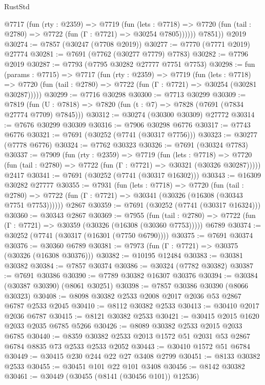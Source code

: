 \begin{lexlean}{RustStd}
\begin{coremodule}
          @7717
            (fun (rty : @2359) =>
            @7719
              (fun (lets : @7718) =>
              @7720 (fun (tail : @2780) => @7722 (fun (Γ : @7721) => @30254 @7805))))))
        @7851))
    @2019
@30274 := @7857 (@30247 (@7708 @2019))
@30277 := @7770 (@7771 @2019) @27774
@30281 := @7691 (@7762 (@30277 @7779) @7783)
@30282 := @7796 @2019
@30287 := @7793 (@7795 @30282 @27777 @7751 @7753)
@30298 := fun (params : @7715) =>
  @7717
    (fun (rty : @2359) =>
    @7719
      (fun (lets : @7718) =>
      @7720 (fun (tail : @2780) => @7722 (fun (Γ : @7721) => @30254 (@30281 @30287)))))
@30299 := @7716 @30298
@30300 := @7713 @30299
@30309 := @7819
    (fun (U : @7818) => @7820 (fun (t : @7) => @7828 (@7691 (@7834 @27774 @7709) @7845)))
@30312 := @30274 (@30300 @30309) @27772
@30314 := @7676 @30299 @30309
@30316 := @7906 @30298 @6776
@30317 := @7743 @6776
@30321 := @7691 (@30252 (@7741 (@30317 @7756)))
@30323 := @30277 (@7778 @6776)
@30324 := @7762 @30323
@30326 := @7691 (@30324 @7783)
@30337 := @7909
    (fun (rty : @2359) =>
    @7719
      (fun (lets : @7718) =>
      @7720 (fun (tail : @2780) => @7722 (fun (Γ : @7721) => @30321 (@30326 @30287)))))
    @2417
@30341 := @7691 (@30252 (@7741 (@30317 @16302)))
@30343 := @16309 @30282 @27777
@30355 := @7931
    (fun (lets : @7718) =>
    @7720
      (fun (tail : @2780) =>
      @7722 (fun (Γ : @7721) => @30341 (@30326 (@16308 (@30343 @7751 @7753))))))
    @2867
@30359 := @7691 (@30252 (@7741 (@30317 @16324)))
@30360 := @30343 @2867
@30369 := @7955
    (fun (tail : @2780) => @7722 (fun (Γ : @7721) => @30359 (@30326 (@16308 (@30360 @7753)))))
    @6789
@30374 := @30252 (@7741 (@30317 (@16301 (@7750 @6790))))
@30375 := @7691 @30374
@30376 := @30360 @6789
@30381 := @7973 (fun (Γ : @7721) => @30375 (@30326 (@16308 @30376)))
@30382 := @10195 @12484
@30383 := @30381 @30382
@30384 := @7857 @30374
@30386 := @30324 (@7782 @30382)
@30387 := @7691 @30386
@30390 := @7789 @30382 @16307 @30376
@30394 := @30384 (@30387 @30390) (@8061 @30251)
@30398 := @7857 @30386 @30390 (@8066 @30323)
@30408 := @8098 @30382 @2533 @2008 @2017 @2036 @53 @2867 @6787 @2533 @2045
@30410 := @8112 @30382 @2533
@30413 := @30410 @2017 @2036 @6787
@30415 := @8121 @30382 @2533
@30421 := @30415 @2015 @1620 @2033 @2035 @6785 @5266
@30426 := @8089 @30382 @2533 @2015 @2033 @6785
@30440 := @8359 @30382 @2533 @2013 @1572 @51 @2031 @53 @2867 @6784 @8835 @73 @2533 @2533 @2052
@30443 := @30410 @1572 @51 @6784
@30449 := @30415 @230 @244 @22 @27 @3408 @2799
@30451 := @8133 @30382 @2533
@30455 := @30451 @101 @22 @101 @3408
@30456 := @8142 @30382
@30461 := @30449 (@30455 (@8141 (@30456 @101)) @12536)

\end{coremodule}
\end{lexlean}
